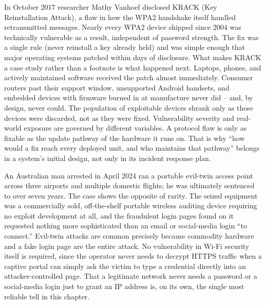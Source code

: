 \begin{example}
In October 2017 researcher Mathy Vanhoef disclosed KRACK (Key Reinstallation Attack), a flaw in how
the WPA2 handshake itself handled retransmitted messages. Nearly every WPA2 device
shipped since 2004 was technically vulnerable as a result, independent of password strength. The
fix was a single rule (never reinstall a key already held) and was simple enough that major
operating systems patched within days of disclosure. What makes KRACK a case study rather than a
footnote is what happened next. Laptops, phones, and actively maintained software received the
patch almost immediately. Consumer routers past their support window, unsupported Android
handsets, and embedded devices with firmware burned in at manufacture never did -- and, by design,
never could. The population of exploitable devices shrank only as those devices were discarded,
not as they were fixed. Vulnerability severity and real-world exposure are governed by different
variables. A protocol flaw is only as fixable as the update pathway of the hardware it runs on.
That is why ``how would a fix reach every deployed unit, and who maintains that pathway'' belongs
in a system's initial design, not only in its incident response plan.
\end{example}

\begin{misconception}
An Australian man arrested in April 2024 ran a portable evil-twin access point across three
airports and multiple domestic flights; he was ultimately sentenced to over seven years. The case
shows the opposite of rarity. The seized equipment was a commercially sold, off-the-shelf portable
wireless auditing device requiring no exploit development at all, and the fraudulent login pages
found on it requested nothing more sophisticated than an email or social-media login ``to
connect.'' Evil-twin attacks are common precisely because commodity hardware and a fake login page
are the entire attack. No vulnerability in Wi-Fi security itself is required, since the operator
never needs to decrypt HTTPS traffic when a captive portal can simply ask the victim to type a
credential directly into an attacker-controlled page. That a legitimate network never needs a
password or a social-media login just to grant an IP address is, on its own, the single most
reliable tell in this chapter.
\end{misconception}

